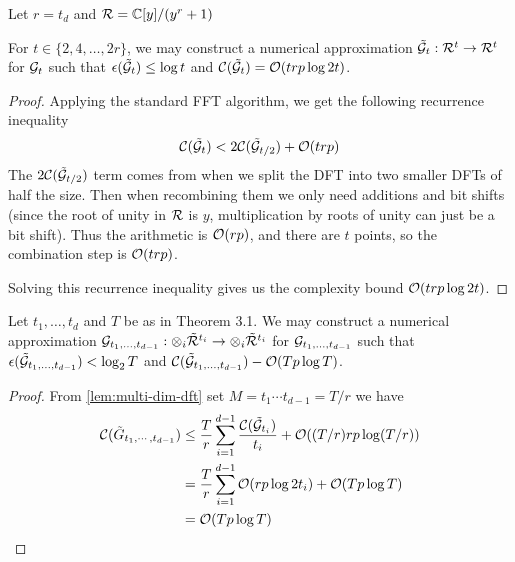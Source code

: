 Let $r = t_d$ and $\mathcal R = {\mathbb C}[y] / (y^r + 1)$

\begin{lemma}
    For $t \in \{2, 4, \ldots, 2r\}$, we may construct a numerical approximation $\tilde{\mathcal G}_t: \mathcal R^t \to \mathcal R^t$ for $\mathcal G_t$ such that $\epsilon (\tilde{\mathcal G}_t) \leq \log t$ and $\mathcal C(\tilde{\mathcal G}_t)= \mathcal O(trp \log 2t)$.
\end{lemma}

\begin{proof}
    Applying the standard FFT algorithm, we get the following recurrence inequality
    \[
        \mathcal C(\tilde{\mathcal G}_t) < 2 \mathcal C(\tilde{\mathcal G}_{t/2}) + \mathcal O(trp)
    \]
    The $2 \mathcal C(\tilde{\mathcal G}_{t/2})$ term comes from when we split the DFT into two smaller DFTs of half the size. Then when recombining them we only need additions and bit shifts (since the root of unity in $\mathcal R$ is $y$, multiplication by roots of unity can just be a bit shift). Thus the arithmetic is $\mathcal O(rp)$, and there are $t$ points, so the combination step is $\mathcal O(trp)$.

    Solving this recurrence inequality gives us the complexity bound $\mathcal O(trp \log 2t)$.
\end{proof}

\begin{proposition}
    Let $t_1, \ldots, t_d$ and $T$ be as in Theorem 3.1. We may construct a numerical approximation $\mathcal G_{t_1, \ldots, t_{d-1}}: \otimes_i \tilde{\mathcal R}^{t_i} \to \otimes_i \tilde{\mathcal R}^{t_i}$ for $\mathcal G_{t_1, \ldots, t_{d-1}}$ such that $\epsilon(\tilde{\mathcal G}_{t_1, \ldots, t_{d-1}}) < \log_2 T$ and $\mathcal C(\tilde{\mathcal G}_{t_1, \ldots, t_{d-1}}) - \mathcal O(Tp \log T)$.
\end{proposition}

\begin{proof}
    From \ref{lem:multi-dim-dft} set $M = t_1\cdots t_{d-1} = T/r$ we have
    \begin{align*}
        \mathcal C(\tilde{G}_{t_1, \cdots, t_{d-1}}) &\leq \frac{T}{r} \sum^{d-1}_{i=1} \frac{\mathcal C(\tilde{\mathcal G}_{t_i})}{t_i} + \mathcal O((T/r)rp\log (T / r))\\
                                                &= \frac{T}{r}\sum^{d-1}_{i=1}\mathcal O(rp\log 2t_i) + \mathcal O(Tp \log T)\\
                                                &= \mathcal O(Tp \log T)
    \end{align*}
\end{proof}

